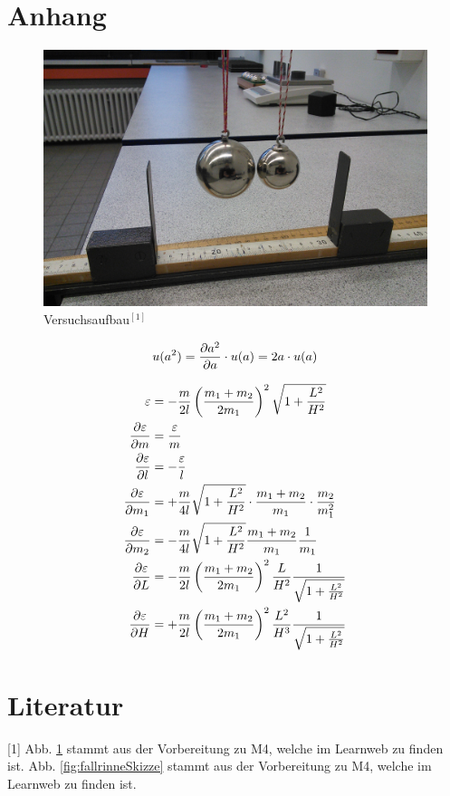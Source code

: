 \documentclass[11pt,a4paper,titlepage, ngerman]{article}
\begin{document}
	\newpage
	
	\section{Anhang} %
	
	
	\begin{figure}[ht]
		\centering
		\includegraphics[width=\textwidth]{M4_1.jpg}
		\caption{Versuchsaufbau$^{[1]}$}
		\label{abb:VersuchsaufbauStoss}	
	\end{figure}

	\begin{equation}
		\label{eq:unce_auslenkung2}
		u(a^2) = \pdv{a^2}{a} \cdot u(a) = 2 a \cdot u(a)
	\end{equation}

	\begin{align}
		\label{eq:epsilon}
		\varepsilon &= -\frac{m}{2 l} \left( \frac{m_1 + m_2}{2 m_1}\right) ^2 \sqrt{1+\frac{L^2}{H^2}}\\
		\pdv{\varepsilon}{m} &= \frac{\varepsilon}{m}\\
		\pdv{\varepsilon}{l} &= -\frac{\varepsilon}{l}\\
		\pdv{\varepsilon}{m_1} &= +\frac{m}{4 l} \sqrt{1+\frac{L^2}{H^2}} \cdot \frac{m_1 + m_2}{m_1} \cdot \frac{m_2}{m_1^2}\\
		\pdv{\varepsilon}{m_2} &= -\frac{m}{4 l} \sqrt{1+\frac{L^2}{H^2}} \frac{m_1 + m_2}{m_1} \frac{1}{m_1}\\
		\pdv{\varepsilon}{L} &= -\frac{m}{2 l} \left( \frac{m_1 + m_2}{2 m_1}\right) ^2 \frac{L}{H^2}\frac{1}{\sqrt{1+\frac{L^2}{H^2}}}\\
		\pdv{\varepsilon}{H} &= +\frac{m}{2 l} \left( \frac{m_1 + m_2}{2 m_1}\right) ^2 \frac{L^2}{H^3}\frac{1}{\sqrt{1+\frac{L^2}{H^2}}}
		\label{eq:epsilonEnd}
	\end{align}
	
	\section*{Literatur}
	
	
	[1] Abb. \ref{abb:VersuchsaufbauStoss} stammt aus der Vorbereitung zu M4, welche im Learnweb zu finden ist.
	\newline
	[2] Abb. \ref{fig:fallrinneSkizze} stammt aus der Vorbereitung zu M4, welche im Learnweb zu finden ist.
	
\end{document}
